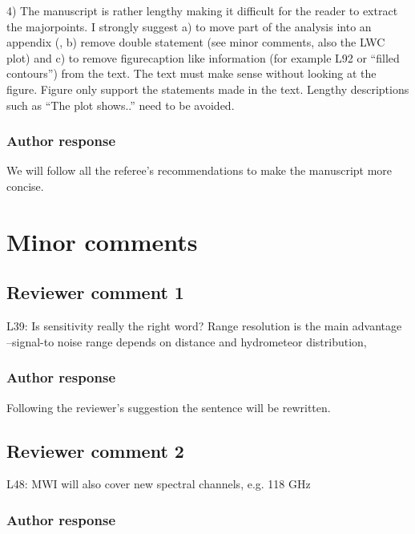 \documentclass[11pt]{scrartcl}
\begin{document}
4) The manuscript is rather lengthy making it difficult for the reader to
extract the majorpoints. I strongly suggest a) to move part of the analysis into
an appendix (, b) remove double statement (see minor comments, also the LWC plot)
and c) to remove figurecaption like information (for example L92 or “filled
contours”) from the text. The text must make sense without looking at the figure.
Figure only support the statements made in the text. Lengthy descriptions such as
“The plot shows..” need to be avoided.

\subsubsection*{Author response}

We will follow all the referee's recommendations to make the manuscript more
concise.

\section{Minor comments}
\subsection*{Reviewer comment 1}

L39: Is sensitivity really the right word? Range resolution is the main
advantage –signal-to noise range depends on distance and hydrometeor
distribution,

\subsubsection*{Author response}

Following the reviewer's suggestion the sentence will be rewritten.


\subsection*{Reviewer comment 2}

L48: MWI will also cover new spectral channels, e.g. 118 GHz

\subsubsection*{Author response}
\end{document}
